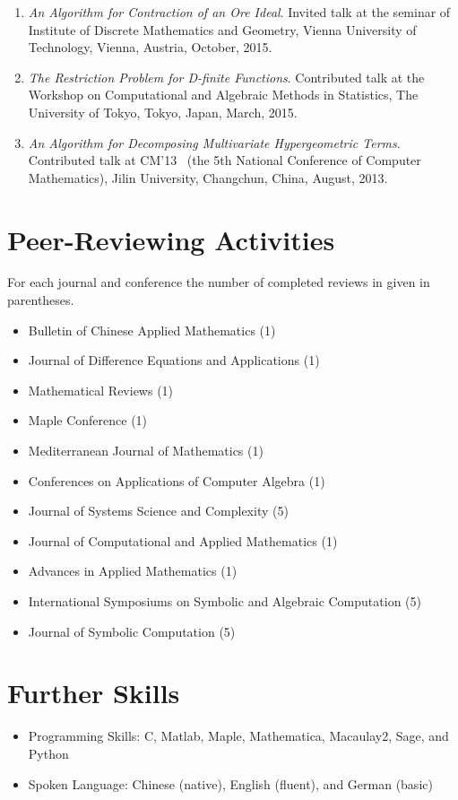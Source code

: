 \documentclass[a4paper,12pt]{article}
\begin{document}
\begin{enumerate}
 \item {\em An Algorithm for Contraction of an Ore Ideal}. Invited talk at the seminar of Institute of Discrete Mathematics and Geometry, 
       Vienna University of Technology, Vienna, Austria, October, 2015.
 \item {\em The Restriction Problem for D-finite Functions}. 
       Contributed talk at the Workshop on Computational and Algebraic Methods in Statistics,
       The University of Tokyo, Tokyo, Japan, March, 2015.
 \item {\em An Algorithm for Decomposing Multivariate Hypergeometric Terms}. Contributed talk at CM'13
       \ (the 5th National Conference of Computer Mathematics), Jilin University, Changchun, China, August, 2013.
\end{enumerate}

\section*{\Large Peer-Reviewing Activities}
For each journal and conference the number of completed reviews in given in parentheses.
\begin{itemize}
\item Bulletin of Chinese Applied Mathematics (1)
\item Journal of Difference Equations and Applications (1)
\item Mathematical Reviews (1)
\item Maple Conference (1)
\item Mediterranean Journal of Mathematics (1)
\item Conferences on Applications of Computer Algebra (1)
 \item Journal of Systems Science and Complexity (5)
 \item Journal of Computational and Applied Mathematics (1)
 \item Advances in Applied Mathematics (1)
 \item International Symposiums on Symbolic and Algebraic Computation (5)
 \item Journal of Symbolic Computation (5)
\end{itemize}

\section*{\Large{Further Skills}}
\begin{itemize}
 \item Programming Skills: C, Matlab, Maple, Mathematica, Macaulay2, Sage, and Python
 \item Spoken Language: Chinese (native), English (fluent), and German (basic)
\end{itemize}
\end{document}
